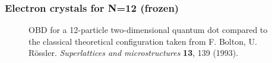 \begin{frame}
\frametitle{Electron crystals for N=12 (frozen)}
 \begin{figure}
 \begin{center}
  \label{fig:wigner20}
  \caption{OBD for a 12-particle two-dimensional quantum dot compared to the classical theoretical configuration taken from F. Bolton, U. Rössler.  \textit{Superlattices and microstructures} \textbf{13}, 139 (1993).}
 \end{center}
\end{figure}
\end{frame}


